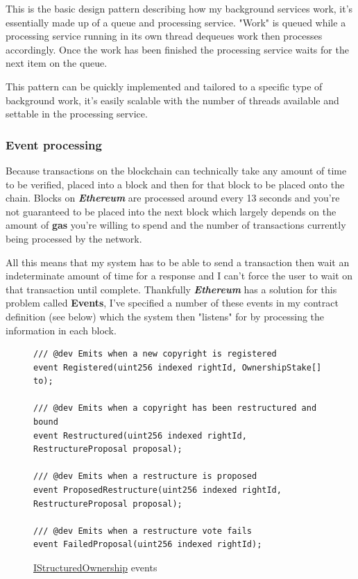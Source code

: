 \documentclass[12pt]{article}
\newcommand{\keyword}[1]{\textbf{\textit{#1}}}
\begin{document}
This is the basic design pattern describing how my background services work, it's essentially made up of a queue and processing service. "Work" is queued while a processing service running in its own thread dequeues work then processes accordingly. Once the work has been finished the processing service waits for the next item on the queue.

This pattern can be quickly implemented and tailored to a specific type of background work, it's easily scalable with the number of threads available and settable in the processing service.

\subsubsection{Event processing}

Because transactions on the blockchain can technically take any amount of time to be verified, placed into a block and then for that block to be placed onto the chain. Blocks on \keyword{Ethereum} are processed around every 13 seconds and you're not guaranteed to be placed into the next block which largely depends on the amount of \textbf{gas} you're willing to spend and the number of transactions currently being processed by the network.

All this means that my system has to be able to send a transaction then wait an indeterminate amount of time for a response and I can't force the user to wait on that transaction until complete. Thankfully \keyword{Ethereum} has a solution for this problem called \textbf{Events}, I've specified a number of these events in my contract definition (see below) which the system then "listens" for by processing the information in each block.

\begin{figure}[H]
\caption{\href{https://github.com/MrHarrisonBarker/CRPL/blob/main/CRPL.Contracts/contracts/IStructuredOwnership.sol}{IStructuredOwnership} events}
\begin{verbatim}
/// @dev Emits when a new copyright is registered
event Registered(uint256 indexed rightId, OwnershipStake[] to);

/// @dev Emits when a copyright has been restructured and bound
event Restructured(uint256 indexed rightId, RestructureProposal proposal);

/// @dev Emits when a restructure is proposed
event ProposedRestructure(uint256 indexed rightId, RestructureProposal proposal);

/// @dev Emits when a restructure vote fails
event FailedProposal(uint256 indexed rightId);
\end{verbatim}
\end{figure}
\end{document}
